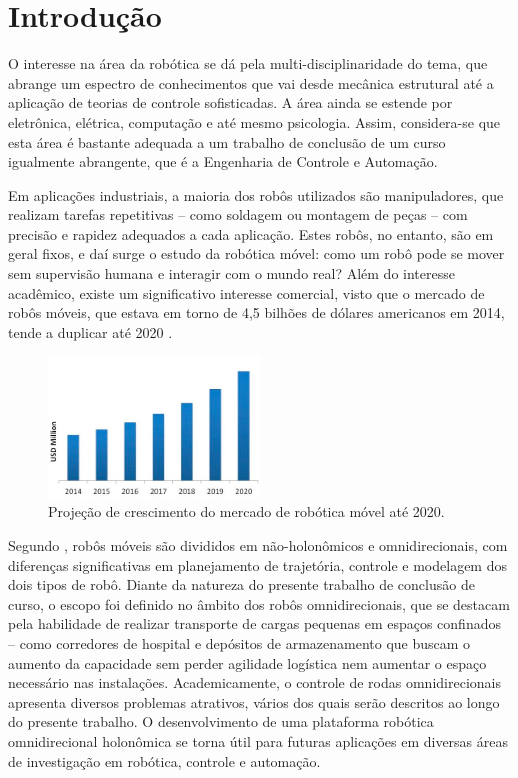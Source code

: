 \section{Introdução}


O interesse na área da robótica se dá pela multi-disciplinaridade do tema, que abrange um espectro de conhecimentos que vai desde mecânica estrutural até a aplicação de teorias de controle sofisticadas. A área ainda se estende por eletrônica, elétrica, computação e até mesmo psicologia. Assim, considera-se que esta área é bastante adequada a um trabalho de conclusão de um curso igualmente abrangente, que é a Engenharia de Controle e Automação.

Em aplicações industriais, a maioria dos robôs utilizados são manipuladores, que realizam tarefas repetitivas -- como soldagem ou montagem de peças -- com precisão e rapidez adequados a cada aplicação. Estes robôs, no entanto, são em geral fixos, e daí surge o estudo da robótica móvel: como um robô pode se mover sem supervisão humana e interagir com o mundo real? \citep{siegwart2011introduction} Além do interesse acadêmico, existe um significativo interesse comercial, visto que o mercado de robôs móveis, que estava em torno de 4,5 bilhões de dólares americanos em 2014, tende a duplicar até 2020 \citep{marketsmarkets}.

\begin{figure}[h]
  \centering
  \includegraphics[width = 0.5\textwidth]{imagens/markets}
  \caption{Projeção de crescimento do mercado de robótica móvel até 2020.}
  \label{fig:markets}
\end{figure}

Segundo \citet{lynch2017modern}, robôs móveis são divididos em não-holonômicos e omnidirecionais, com diferenças significativas em planejamento de trajetória, controle e modelagem dos dois tipos de robô. Diante da natureza do presente trabalho de conclusão de curso, o escopo foi definido no âmbito dos robôs omnidirecionais, que se destacam pela habilidade de realizar transporte de cargas pequenas em espaços confinados -- como corredores de hospital e depósitos de armazenamento que buscam o aumento da capacidade sem perder agilidade logística nem aumentar o espaço necessário nas instalações. Academicamente, o controle de rodas omnidirecionais apresenta diversos problemas atrativos, vários dos quais serão descritos ao longo do presente trabalho. O desenvolvimento de uma plataforma robótica omnidirecional holonômica se torna útil para futuras aplicações em diversas áreas de investigação em robótica, controle e automação.

